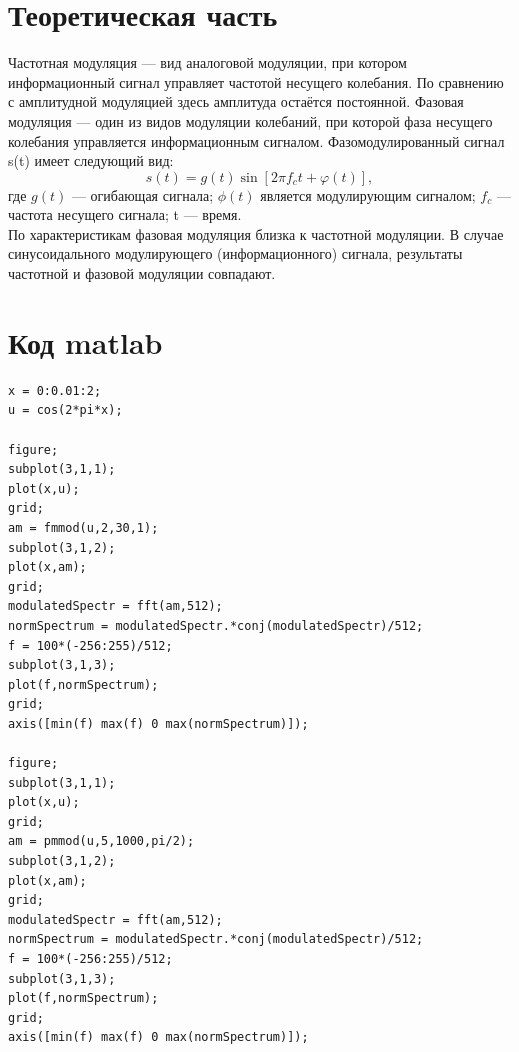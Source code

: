 \documentclass[10pt,a4paper]{report}
\begin{document}
\section{Теоретическая часть}
Частотная модуляция — вид аналоговой модуляции, при котором информационный сигнал управляет частотой несущего колебания. По сравнению с амплитудной модуляцией здесь амплитуда остаётся постоянной.\newline
Фазовая модуляция — один из видов модуляции колебаний, при которой фаза несущего колебания управляется информационным сигналом. Фазомодулированный сигнал s(t) имеет следующий вид:
\begin{equation} 
s(t) = g(t) \sin[2 \pi f_c t + \varphi(t)] ,
\end{equation}
где $g(t)$ — огибающая сигнала; $\phi(t)$ является модулирующим сигналом; $f_c$ — частота несущего сигнала; t — время.\\
По характеристикам фазовая модуляция близка к частотной модуляции. В случае синусоидального модулирующего (информационного) сигнала, результаты частотной и фазовой модуляции совпадают.
\section{Код matlab}
\begin{verbatim}
x = 0:0.01:2;
u = cos(2*pi*x);

figure;
subplot(3,1,1);
plot(x,u);
grid;
am = fmmod(u,2,30,1);
subplot(3,1,2);
plot(x,am);
grid;
modulatedSpectr = fft(am,512);
normSpectrum = modulatedSpectr.*conj(modulatedSpectr)/512;
f = 100*(-256:255)/512;
subplot(3,1,3);
plot(f,normSpectrum);
grid;
axis([min(f) max(f) 0 max(normSpectrum)]);

figure;
subplot(3,1,1);
plot(x,u);
grid;
am = pmmod(u,5,1000,pi/2);
subplot(3,1,2);
plot(x,am);
grid;
modulatedSpectr = fft(am,512);
normSpectrum = modulatedSpectr.*conj(modulatedSpectr)/512;
f = 100*(-256:255)/512;
subplot(3,1,3);
plot(f,normSpectrum);
grid;
axis([min(f) max(f) 0 max(normSpectrum)]);
\end{verbatim}
\end{document}

